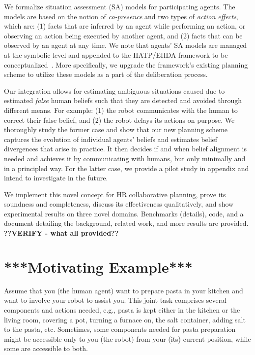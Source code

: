 \documentclass[letterpaper]{article} %
\begin{document}
We formalize situation assessment (SA) models for participating agents. 
The models are based on the notion of {\em co-presence} and two types of \textit{action effects}, which are: (1) facts that are inferred by an agent while performing an action, or observing an action being executed by another agent, and (2) facts that can be observed by an agent at any time.
We note that agents' SA models are managed at the symbolic level and appended to the HATP/EHDA framework to be conceptualized~\cite{buisan:hal-03684211}. 
More specifically, we upgrade the framework's existing planning scheme to utilize these models as a part of the deliberation process.   

Our integration allows for estimating ambiguous situations caused due to estimated \textit{false} human beliefs such that they are detected and avoided through different means. 
For example: (1) the robot communicates with the human to correct their false belief, and (2) the robot delays its actions on purpose. We thoroughly study the former case and show that our new planning scheme captures the evolution of individual agents' beliefs and estimates belief divergences that arise in practice. 
It then decides if and when belief alignment is needed and achieves it by communicating with humans, but only minimally and in a principled way. 
For the latter case, we provide a pilot study in appendix and intend to investigate in the future.   

We implement this novel concept for HR collaborative planning, prove its soundness and completeness, discuss its effectiveness qualitatively, and show experimental results on three novel domains. Benchmarks (details), code, and a document detailing the background, related work, and more results are provided. 
\textbf{??VERIFY - what all provided??}


\section{***Motivating Example***}
Assume that you (the human agent) want to prepare pasta in your kitchen and want to involve your robot to assist you. This joint task comprises several components and actions needed, e.g., pasta is kept either in the kitchen or the living room, covering a pot, turning a furnace on, the salt container, adding salt to the pasta, etc. 
Sometimes, some components needed for pasta preparation might be accessible only to you (the robot) from your (its) current position, while some are accessible to both. 
\end{document}

